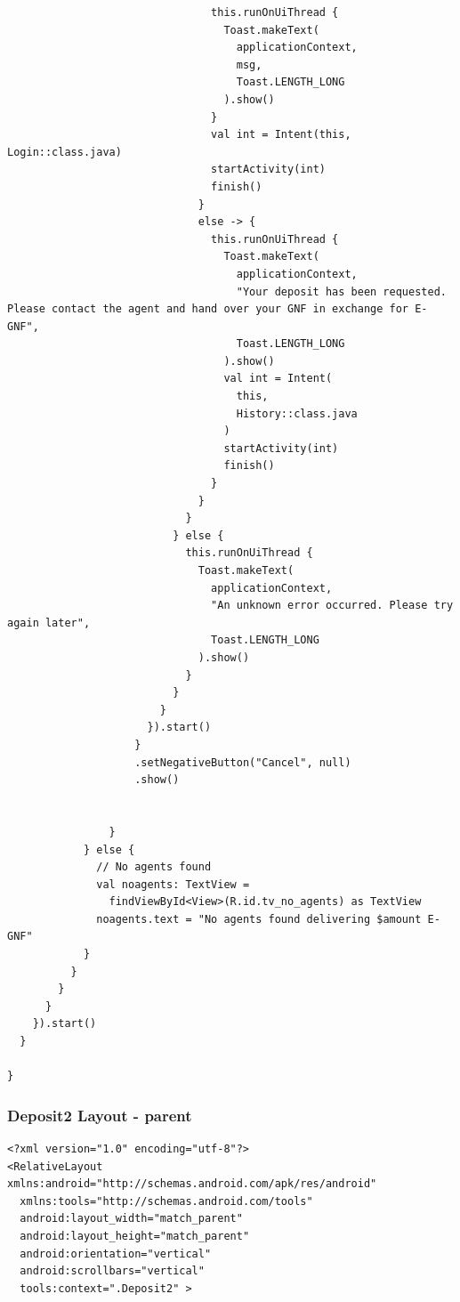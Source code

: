 \documentclass[11pt, a4paper]{article}
\begin{document}
\begin{appendices}
\begin{lstlisting}
                                this.runOnUiThread {
                                  Toast.makeText(
                                    applicationContext,
                                    msg,
                                    Toast.LENGTH_LONG
                                  ).show()
                                }
                                val int = Intent(this, Login::class.java)
                                startActivity(int)
                                finish()
                              }
                              else -> {
                                this.runOnUiThread {
                                  Toast.makeText(
                                    applicationContext,
                                    "Your deposit has been requested. Please contact the agent and hand over your GNF in exchange for E-GNF",
                                    Toast.LENGTH_LONG
                                  ).show()
                                  val int = Intent(
                                    this,
                                    History::class.java
                                  )
                                  startActivity(int)
                                  finish()
                                }
                              }
                            }
                          } else {
                            this.runOnUiThread {
                              Toast.makeText(
                                applicationContext,
                                "An unknown error occurred. Please try again later",
                                Toast.LENGTH_LONG
                              ).show()
                            }
                          }
                        }
                      }).start()
                    }
                    .setNegativeButton("Cancel", null)
                    .show()


                }
            } else {
              // No agents found
              val noagents: TextView =
                findViewById<View>(R.id.tv_no_agents) as TextView
              noagents.text = "No agents found delivering $amount E-GNF"
            }
          }
        }
      }
    }).start()
  }

}
\end{lstlisting}
\subsubsection{Deposit2 Layout - parent}
\begin{lstlisting}
<?xml version="1.0" encoding="utf-8"?>
<RelativeLayout xmlns:android="http://schemas.android.com/apk/res/android"
  xmlns:tools="http://schemas.android.com/tools"
  android:layout_width="match_parent"
  android:layout_height="match_parent"
  android:orientation="vertical"
  android:scrollbars="vertical"
  tools:context=".Deposit2" >



\end{lstlisting}
\end{appendices}
\end{document}
